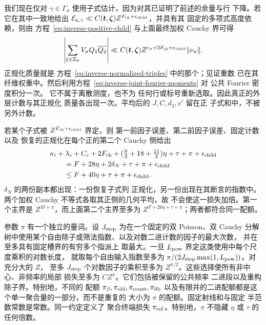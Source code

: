 我们现在仅对
\(\gamma\in\Gamma_\sigma\) 使用子式估计，因为对其已证明了前述的余量与行
下降。若它在其中一致地给出
\(\mathcal E_{a,\gamma}\ll C(\boldsymbol t,\boldsymbol\zeta)
Z^{F_{\rm ch}+\epsilon_{\rm child}}\)，并具有其
固定的多项式高度依赖，则由
方程~\eqref{eq:inverse-positive-child} 与上面最终加权
Cauchy 界可得
\[
 \left|\sum_{\xi\in\Xi_\sigma}V_\sigma Q_1\overline{Q_2}\right|
 \ll C(\boldsymbol t,\boldsymbol\zeta)
 Z^{c_\sigma+2F_{\rm ch}+\epsilon_{\rm child}}\|\nu_\sigma\|.
\]
正规化质量就是
方程~\eqref{eq:inverse-normalized-triples} 中的那个；见证重数
已在其纤维权重中。然后利用方程~\eqref{eq:inverse-joint-fourier-moments} 对
公共 Fourier 密度积分一次。
它不属于离散测度，也不为
任何行或标号重新选取。因此真正的外层计数与其正规化
质量各出现一次。平均后的 \(J,C,d_2,v'\) 留在正
子式和中，不被另外计数。

若某个子式被 \(Z^{F_{\rm ch}+\epsilon_{\rm child}}\) 界定，则
第一前因子误差、第二前因子误差、固定计数以及
恢复的正规化在每个正的第二个 Cauchy 侧给出
\begin{equation}\label{eq:inverse-step-loss}
 \begin{split}
 &\kappa_i+\lambda_c+C_c+2F_{\rm ch}
      +(\tfrac92+18+\tfrac{11}2)\eta+\tau+\pi+\epsilon_{\rm child}\\
 &\qquad=F+28\eta+2\delta_N+\tau+\pi+\epsilon_{\rm child}\\
 &\qquad\le F+40\eta+\tau+\pi+\epsilon_{\rm child}.
 \end{split}
\end{equation}
\(\delta_N\) 的两份副本都出现：一份恢复子式列
正规化，另一份出现在其断言的指数中。两个加权
Cauchy 不等式各取其正侧的几何平均，故
不会使这一损失加倍。第一个主界是
\(Z^{M+\pi}\)，而上面第二个主界至多为
\(Z^{F+26\eta+\tau+\pi}\)；两者都符合同一配额。

参数 \(\pi\) 有一个独立的量词。设 \(J_{\rm step}\)
为在一个固定的双 Poisson、双 Cauchy
分解树中使用某个自由除子或筛法指数、以及对数二进计数的因子的最大次数，
并在至多具有固定槽界的有穷多个指派上
取最大。一旦 \(L_{\rm pow}\) 界定这类使用中每个尺度乘积的对数长度，
就取每个自由输入指数至多为
\(\pi/(2J_{\rm step}\max(1,L_{\rm pow}))\)。对充分大的 \(Z\)，
至多 \(J_{\rm step}\) 个对数因子的乘积至多为
\(Z^{\pi/2}\)。这些选择使所有非中心、非频率的局部
损失至多为 \(CZ^\pi\)。它们包括被保留的公共频率
二进段以及重构除子界。特别地，不同的
配额 \(\pi_\beta,\pi_{\rm old},\pi_{\rm count},\pi_{\rm fib}\)
以及有限并的二进配额都是这个单一聚合量的一部分，而不是重复的
大小为 \(\pi\) 的配额。固定射线和与固定
半范数常数是常数。同一约定定义了
聚合终端损失 \(\pi_{\rm ref}\)。特别地，\(\pi\) 不隐藏
\(\eta\) 或 \(\tau\) 的任何倍数。


